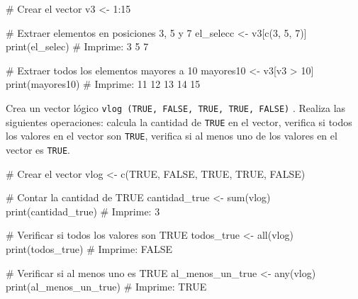 \documentclass[
  letterpaper,
]{scrbook}
\newenvironment{Shaded}{\begin{snugshade}}{\end{snugshade}}
\newcommand{\CommentTok}[1]{\textcolor[rgb]{0.37,0.37,0.37}{#1}}
\newcommand{\ConstantTok}[1]{\textcolor[rgb]{0.56,0.35,0.01}{#1}}
\newcommand{\DecValTok}[1]{\textcolor[rgb]{0.68,0.00,0.00}{#1}}
\newcommand{\FunctionTok}[1]{\textcolor[rgb]{0.28,0.35,0.67}{#1}}
\newcommand{\NormalTok}[1]{\textcolor[rgb]{0.00,0.23,0.31}{#1}}
\newcommand{\OtherTok}[1]{\textcolor[rgb]{0.00,0.23,0.31}{#1}}
\newcommand{\SpecialCharTok}[1]{\textcolor[rgb]{0.37,0.37,0.37}{#1}}
\begin{document}
\begin{Shaded}
\begin{Highlighting}[]
\CommentTok{\# Crear el vector}
\NormalTok{v3 }\OtherTok{\textless{}{-}} \DecValTok{1}\SpecialCharTok{:}\DecValTok{15}

\CommentTok{\# Extraer elementos en posiciones 3, 5 y 7}
\NormalTok{el\_selecc }\OtherTok{\textless{}{-}}\NormalTok{ v3[}\FunctionTok{c}\NormalTok{(}\DecValTok{3}\NormalTok{, }\DecValTok{5}\NormalTok{, }\DecValTok{7}\NormalTok{)]}
\FunctionTok{print}\NormalTok{(el\_selec)  }\CommentTok{\# Imprime: 3 5 7}

\CommentTok{\# Extraer todos los elementos mayores a 10}
\NormalTok{mayores10 }\OtherTok{\textless{}{-}}\NormalTok{ v3[v3 }\SpecialCharTok{\textgreater{}} \DecValTok{10}\NormalTok{]}
\FunctionTok{print}\NormalTok{(mayores10)  }\CommentTok{\# Imprime: 11 12 13 14 15}
\end{Highlighting}
\end{Shaded}

Crea un vector lógico
\texttt{vlog\ (TRUE,\ FALSE,\ TRUE,\ TRUE,\ FALSE)} . Realiza las
siguientes operaciones: calcula la cantidad de \texttt{TRUE} en el
vector, verifica si todos los valores en el vector son \texttt{TRUE},
verifica si al menos uno de los valores en el vector es \texttt{TRUE}.

\begin{Shaded}
\begin{Highlighting}[]
\CommentTok{\# Crear el vector}
\NormalTok{vlog }\OtherTok{\textless{}{-}} \FunctionTok{c}\NormalTok{(}\ConstantTok{TRUE}\NormalTok{, }\ConstantTok{FALSE}\NormalTok{, }\ConstantTok{TRUE}\NormalTok{, }\ConstantTok{TRUE}\NormalTok{, }\ConstantTok{FALSE}\NormalTok{)}

\CommentTok{\# Contar la cantidad de TRUE}
\NormalTok{cantidad\_true }\OtherTok{\textless{}{-}} \FunctionTok{sum}\NormalTok{(vlog)}
\FunctionTok{print}\NormalTok{(cantidad\_true)  }\CommentTok{\# Imprime: 3}

\CommentTok{\# Verificar si todos los valores son TRUE}
\NormalTok{todos\_true }\OtherTok{\textless{}{-}} \FunctionTok{all}\NormalTok{(vlog)}
\FunctionTok{print}\NormalTok{(todos\_true)  }\CommentTok{\# Imprime: FALSE}

\CommentTok{\# Verificar si al menos uno es TRUE}
\NormalTok{al\_menos\_un\_true }\OtherTok{\textless{}{-}} \FunctionTok{any}\NormalTok{(vlog)}
\FunctionTok{print}\NormalTok{(al\_menos\_un\_true)  }\CommentTok{\# Imprime: TRUE}
\end{Highlighting}
\end{Shaded}
\end{document}
